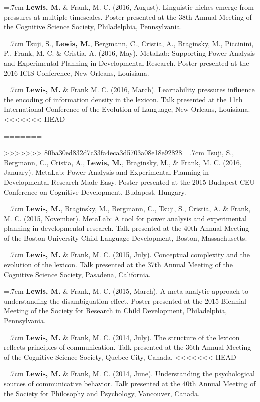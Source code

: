 \documentclass[letterpaper]{article}
\begin{document}
\hangindent=.7cm {\bf Lewis, M.} \& Frank, M. C. (2016, August).  Linguistic niches emerge from pressures at multiple timescales. Poster presented at the 38th Annual Meeting of the Cognitive Science Society, Philadelphia, Pennsylvania.

 \hangindent=.7cm  Tsuji, S., {\bf Lewis, M.}, Bergmann, C., Cristia, A.,  Braginsky, M.,  Piccinini, P., Frank, M. C. \& Cristia, A. (2016, May). MetaLab: Supporting Power Analysis and Experimental Planning in Developmental Research. Poster presented at the 2016 ICIS Conference, New Orleans, Louisiana.


  \hangindent=.7cm {\bf Lewis, M.} \& Frank M. C. (2016, March). Learnability pressures influence the encoding of information density in the lexicon. Talk presented at the 11th International Conference of the Evolution of Language, New Orleans, Louisiana.
<<<<<<< HEAD
  
=======

>>>>>>> 80ba30ed832d7c33fa4eca3d5703a08e18e92828
  \hangindent=.7cm  Tsuji, S., Bergmann, C., Cristia, A., {\bf Lewis, M.}, Braginsky, M., \& Frank, M. C. (2016, January). MetaLab: Power Analysis and Experimental Planning in Developmental Research Made Easy. Poster presented at the 2015 Budapest CEU Conference on Cognitive Development, Budapest, Hungary.


\hangindent=.7cm {\bf Lewis, M.},  Braginsky,  M.,  Bergmann, C., Tsuji, S., Cristia, A. \& Frank, M. C. (2015, November). MetaLab: A tool for power analysis and experimental planning in developmental research. Talk presented at the 40th Annual Meeting of the Boston University Child Language Development, Boston, Massachusetts.

\hangindent=.7cm {\bf Lewis, M.} \& Frank, M. C. (2015, July). Conceptual complexity and the evolution of the lexicon. Talk presented at the 37th Annual Meeting of the Cognitive Science Society, Pasadena, California.

\hangindent=.7cm {\bf Lewis, M.} \& Frank, M. C. (2015, March). A meta-analytic approach to understanding the disambiguation effect. Poster presented at  the 2015 Biennial Meeting of the Society for Research in Child Development, Philadelphia, Pennsylvania.


\hangindent=.7cm {\bf Lewis, M.} \& Frank, M. C. (2014, July). The structure of the lexicon reflects  principles of communication. Talk presented at the 36th Annual Meeting of the Cognitive Science Society, Quebec City, Canada.
<<<<<<< HEAD

\hangindent=.7cm {\bf Lewis, M.} \& Frank, M. C. (2014, June). Understanding the psychological sources of communicative behavior. Talk presented at the 40th Annual Meeting of the Society for Philosophy and Psychology, Vancouver, Canada.
\end{document}
